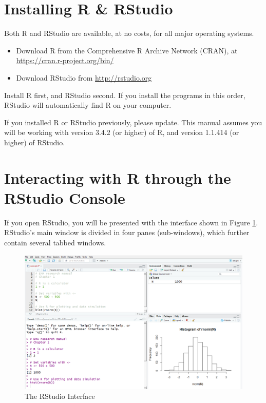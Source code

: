 \documentclass[]{book}
\begin{document}
\section{Installing R \& RStudio}\label{installing-r-rstudio}


Both R and RStudio are available, at no costs, for all major operating
systems.

\begin{itemize}
\item
  Download R from the Comprehensive R Archive Network (CRAN), at
  \url{https://cran.r-project.org/bin/}
\item
  Download RStudio from \url{http://rstudio.org}
\end{itemize}

Install R first, and RStudio second. If you install the programs in this
order, RStudio will automatically find R on your computer.

If you installed R or RStudio previously, please update. This manual
assumes you will be working with version 3.4.2 (or higher) of R, and
version 1.1.414 (or higher) of RStudio.

\section{Interacting with R through the RStudio
Console}\label{interacting-with-r-through-the-rstudio-console}


If you open RStudio, you will be presented with the interface shown in
Figure \ref{fig:r-interface}. RStudio's main window is divided in four
panes (sub-windows), which further contain several tabbed windows.

\begin{figure}

{\centering \includegraphics[width=0.98\linewidth]{images/R/rstudio} 

}

\caption{The RStudio Interface}\label{fig:r-interface}
\end{figure}
\end{document}
